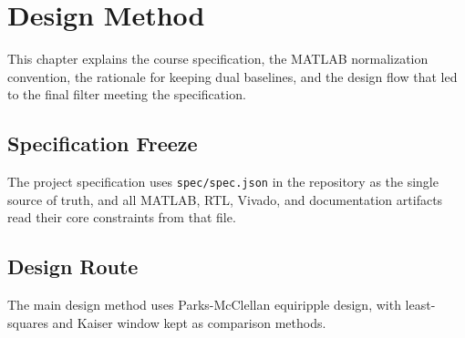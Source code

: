 \section{Design Method}

This chapter explains the course specification, the MATLAB normalization convention, the rationale for keeping dual baselines, and the design flow that led to the final filter meeting the specification.

\subsection{Specification Freeze}

The project specification uses \texttt{spec/spec.json} in the repository as the single source of truth, and all MATLAB, RTL, Vivado, and documentation artifacts read their core constraints from that file.

\subsection{Design Route}

The main design method uses Parks-McClellan equiripple design, with least-squares and Kaiser window kept as comparison methods.
